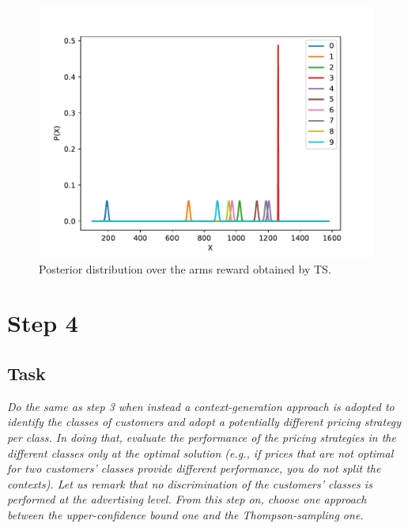 \documentclass[12pt,a4paper]{report}
\begin{document}
\begin{figure}[H]
\centering
  \includegraphics[scale = 0.7, center]{3arms}
  \caption{Posterior distribution over the arms reward obtained by TS.}
\end{figure}

		\section{Step 4}
			\subsection{Task}
\textit{Do the same as step 3 when instead a context-generation approach is adopted to identify the classes of customers and adopt a potentially different pricing strategy per class. In doing that, evaluate the performance of the pricing strategies in the different classes only at the optimal solution (e.g., if prices that are not optimal for two customers’ classes provide different performance, you do not split the contexts). Let us remark that no discrimination of the customers’ classes is performed at the advertising level. From this step on, choose one approach between the upper-confidence bound one and the Thompson-sampling one.}
\end{document}
